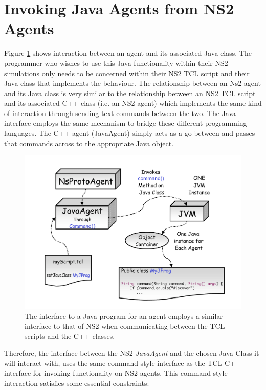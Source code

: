 \section{Invoking Java Agents from NS2 Agents}
\label{jni:invoke}

Figure \ref{jni:fig:javaVM} shows interaction between an agent and 
its associated Java class.  The programmer who wishes to use this
Java functionality within their NS2 simulations only needs to be 
concerned within their NS2 TCL script and their Java class that 
implements the behaviour. The relationship between an Ns2 agent 
and its Java class is very similar to the relationship between an NS2
TCL script and its associated C++ class (i.e. an NS2 agent) which 
implements the same kind of interaction through sending text
commands between the two. The Java interface
employs the same mechanism to bridge these different 
programming languages. The C++ agent (JavaAgent) simply acts
as a go-between and passes that commands across to the
appropriate Java object. 

\begin{figure}
\centering
\includegraphics[scale=0.4]{images/agentuserJVM}
\caption{The interface to a Java program for an agent employs 
a similar interface to that of NS2 when communicating between 
the TCL scripts and the C++ classes. } 
\label{jni:fig:javaVM}
\end{figure}

Therefore, the interface between the NS2 \emph{JavaAgent} 
and the chosen Java Class it will interact with, uses the same 
command-style interface as the TCL-C++ interface for invoking 
functionality on NS2 agents. This command-style interaction 
satisfies some essential constraints:


